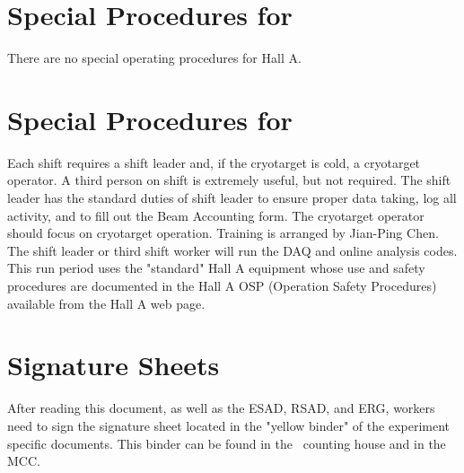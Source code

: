 %
\newpage
\section{Special Procedures for \HALL}

There are no special operating procedures for Hall A.

%
\newpage
\section{Special Procedures for \EXPTS}

Each shift requires a shift leader and, if the cryotarget is cold, a cryotarget 
operator.  A third person on shift is extremely useful, but not required. The shift leader 
has the standard
duties of shift leader to ensure proper data taking, log all activity, and to fill out
the Beam Accounting form. The cryotarget operator should focus on cryotarget
operation. Training is arranged by Jian-Ping Chen. The shift leader or third
shift worker will run the DAQ and online analysis codes.
This run period uses the "standard" Hall A equipment whose
use and safety procedures are documented in the Hall A OSP (Operation Safety
Procedures) available from the Hall A web page.


\newpage
\section{Signature Sheets}

After reading this document, as well as the ESAD, RSAD, and ERG, workers need to sign
the signature sheet located in the "yellow binder" of the experiment specific documents.
This binder can be found in the \HALL\ counting house and in the MCC.

